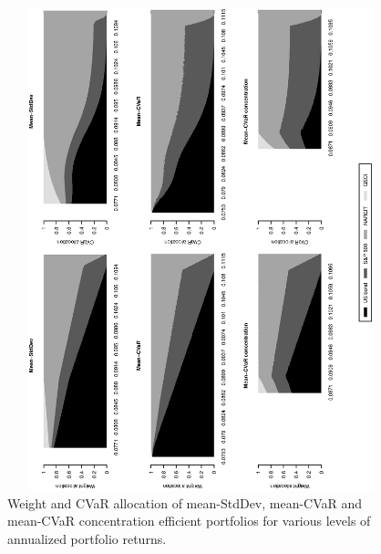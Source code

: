 \documentclass[12pt,a4paper]{article}
\begin{document}
\begin{figure}[t]
\caption{Weight and CVaR allocation of mean-StdDev, mean-CVaR and mean-CVaR concentration efficient
portfolios for various levels of annualized portfolio returns. \label{fig:EfficientFrontier_weights}   }
\includegraphics[width=16cm,height=14cm,angle=270]{stackedweightsriskcont_efficientfrontier_clean.eps}
\end{figure}
\end{document}

